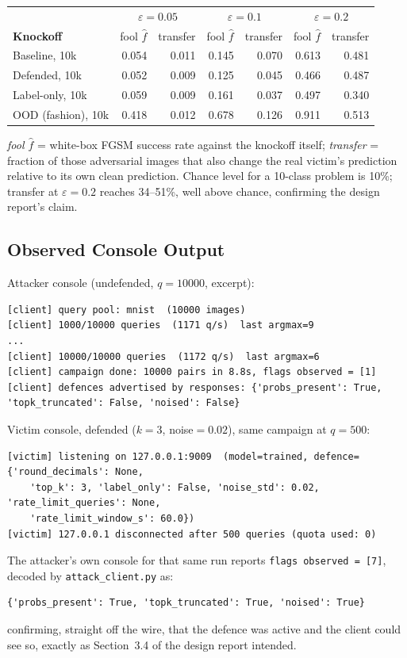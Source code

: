 \documentclass[11pt]{article}
\begin{document}
\begin{center}
\begin{tabular}{@{}lrrrrrr@{}}
\toprule
& \multicolumn{2}{c}{$\varepsilon=0.05$} & \multicolumn{2}{c}{$\varepsilon=0.1$} & \multicolumn{2}{c}{$\varepsilon=0.2$} \\
\textbf{Knockoff} & fool $\hat f$ & transfer & fool $\hat f$ & transfer & fool $\hat f$ & transfer \\
\midrule
Baseline, 10k       & 0.054 & 0.011 & 0.145 & 0.070 & 0.613 & 0.481 \\
Defended, 10k        & 0.052 & 0.009 & 0.125 & 0.045 & 0.466 & 0.487 \\
Label-only, 10k       & 0.059 & 0.009 & 0.161 & 0.037 & 0.497 & 0.340 \\
OOD (fashion), 10k    & 0.418 & 0.012 & 0.678 & 0.126 & 0.911 & 0.513 \\
\bottomrule
\end{tabular}
\end{center}
\emph{fool $\hat f$} = white-box FGSM success rate against the knockoff itself;
\emph{transfer} = fraction of those adversarial images that also change the
real victim's prediction relative to its own clean prediction. Chance level
for a 10-class problem is 10\%; transfer at $\varepsilon=0.2$ reaches 34--51\%,
well above chance, confirming the design report's claim.

\subsection{Observed Console Output}

Attacker console (undefended, $q=10000$, excerpt):
\begin{lstlisting}
[client] query pool: mnist  (10000 images)
[client] 1000/10000 queries  (1171 q/s)  last argmax=9
...
[client] 10000/10000 queries  (1172 q/s)  last argmax=6
[client] campaign done: 10000 pairs in 8.8s, flags observed = [1]
[client] defences advertised by responses: {'probs_present': True, 'topk_truncated': False, 'noised': False}
\end{lstlisting}

Victim console, defended ($k{=}3$, noise$=0.02$), same campaign at $q=500$:
\begin{lstlisting}
[victim] listening on 127.0.0.1:9009  (model=trained, defence={'round_decimals': None,
    'top_k': 3, 'label_only': False, 'noise_std': 0.02, 'rate_limit_queries': None,
    'rate_limit_window_s': 60.0})
[victim] 127.0.0.1 disconnected after 500 queries (quota used: 0)
\end{lstlisting}
The attacker's own console for that same run reports
\texttt{flags observed = [7]}, decoded by \texttt{attack\_client.py} as:
\begin{lstlisting}
{'probs_present': True, 'topk_truncated': True, 'noised': True}
\end{lstlisting}
confirming, straight off the wire, that the defence was active and the client
could see so, exactly as Section~3.4 of the design report intended.
\end{document}
